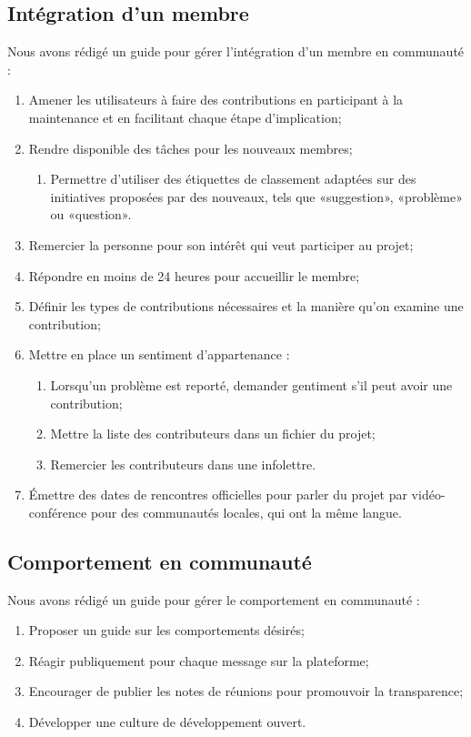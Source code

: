 \subsection{Intégration d’un membre}

Nous avons rédigé un guide pour gérer l'intégration d'un membre en communauté : 
\begin{enumerate}
    \item Amener les utilisateurs à faire des contributions en participant à la maintenance et en facilitant chaque étape d'implication;
    \item Rendre disponible des tâches pour les nouveaux membres;
    \begin{enumerate}
        \item Permettre d'utiliser des étiquettes de classement adaptées sur des initiatives proposées par des nouveaux, tels que «suggestion», «problème» ou «question».
    \end{enumerate}
    \item Remercier la personne pour son intérêt qui veut participer au projet;
    \item Répondre en moins de 24 heures pour accueillir le membre;
    \item Définir les types de contributions nécessaires et la manière qu'on examine une contribution;
    \item Mettre en place un sentiment d'appartenance :
    \begin{enumerate}
        \item Lorsqu'un problème est reporté, demander gentiment s'il peut avoir une contribution;
        \item Mettre la liste des contributeurs dans un fichier du projet;
        \item Remercier les contributeurs dans une infolettre.
    \end{enumerate}
    \item Émettre des dates de rencontres officielles pour parler du projet par vidéo-conférence pour des communautés locales, qui ont la même langue.
\end{enumerate}

\subsection{Comportement en communauté}

Nous avons rédigé un guide pour gérer le comportement en communauté : 
\begin{enumerate}
    \item Proposer un guide sur les comportements désirés;
    \item Réagir publiquement pour chaque message sur la plateforme;
    \item Encourager de publier les notes de réunions pour promouvoir la transparence;
    \item Développer une culture de développement ouvert.
\end{enumerate}

